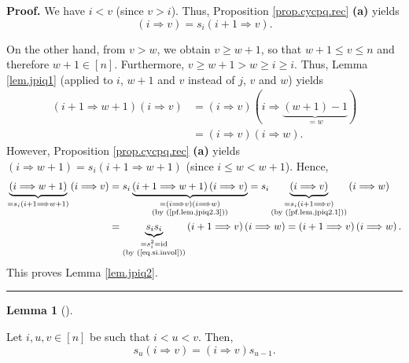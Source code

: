 \documentclass[numbers=enddot,12pt,final,onecolumn,notitlepage]{scrartcl}%
\theoremstyle{definition}
\newtheorem{lem}[theo]{Lemma}
\newenvironment{lemma}[1][]
{\begin{lem}[#1]\begin{leftbar}}
{\end{leftbar}\end{lem}}
\newenvironment{proof}[1][Proof]{\noindent\textbf{#1.} }{\ \rule{0.5em}{0.5em}}
\begin{document}
\begin{proof}
We have $i<v$ (since $v>i$). Thus, Proposition \ref{prop.cycpq.rec}
\textbf{(a)} yields
\begin{equation}
\left(  i\Longrightarrow v\right)  =s_{i}\left(  i+1\Longrightarrow v\right)
. \label{pf.lem.jpiq2.1}%
\end{equation}


On the other hand, from $v>w$, we obtain $v\geq w+1$, so that $w+1\leq v\leq
n$ and therefore $w+1\in\left[  n\right]  $. Furthermore, $v\geq w+1>w\geq
i\geq i$. Thus, Lemma \ref{lem.jpiq1} (applied to $i$, $w+1$ and $v$ instead
of $j$, $v$ and $w$) yields%
\begin{align}
\left(  i+1\Longrightarrow w+1\right)  \left(  i\Longrightarrow v\right)   &
=\left(  i\Longrightarrow v\right)  \left(  i\Longrightarrow
\underbrace{\left(  w+1\right)  -1}_{=w}\right) \nonumber\\
&  =\left(  i\Longrightarrow v\right)  \left(  i\Longrightarrow w\right)  .
\label{pf.lem.jpiq2.3}%
\end{align}
However, Proposition \ref{prop.cycpq.rec} \textbf{(a)} yields $\left(
i\Longrightarrow w+1\right)  =s_{i}\left(  i+1\Longrightarrow w+1\right)  $
(since $i\leq w<w+1$). Hence,%
\begin{align*}
\underbrace{\left(  i\Longrightarrow w+1\right)  }_{=s_{i}\left(
i+1\Longrightarrow w+1\right)  }\left(  i\Longrightarrow v\right)   &
=s_{i}\underbrace{\left(  i+1\Longrightarrow w+1\right)  \left(
i\Longrightarrow v\right)  }_{\substack{=\left(  i\Longrightarrow v\right)
\left(  i\Longrightarrow w\right)  \\\text{(by (\ref{pf.lem.jpiq2.3}))}%
}}=s_{i}\underbrace{\left(  i\Longrightarrow v\right)  }_{\substack{=s_{i}%
\left(  i+1\Longrightarrow v\right)  \\\text{(by (\ref{pf.lem.jpiq2.1}))}%
}}\left(  i\Longrightarrow w\right) \\
&  =\underbrace{s_{i}s_{i}}_{\substack{=s_{i}^{2}=\operatorname*{id}%
\\\text{(by (\ref{eq.si.invol}))}}}\left(  i+1\Longrightarrow v\right)
\left(  i\Longrightarrow w\right)  =\left(  i+1\Longrightarrow v\right)
\left(  i\Longrightarrow w\right)  .
\end{align*}
This proves Lemma \ref{lem.jpiq2}.
\end{proof}

\begin{lemma}
\label{lem.suip}Let $i,u,v\in\left[  n\right]  $ be such that $i<u<v$. Then,%
\[
s_{u}\left(  i\Longrightarrow v\right)  =\left(  i\Longrightarrow v\right)
s_{u-1}.
\]

\end{lemma}
\end{document}
